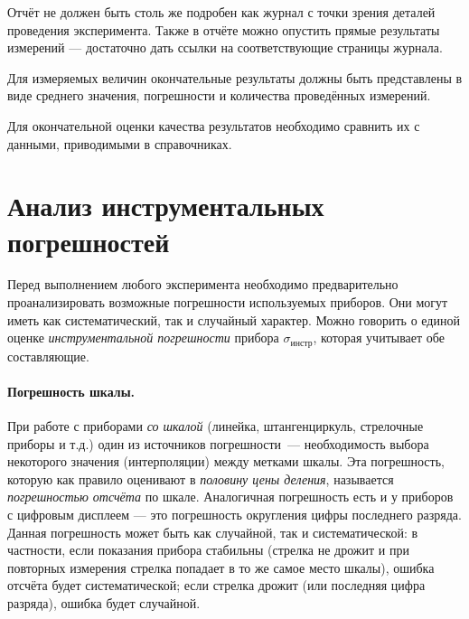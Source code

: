 Отчёт не должен быть столь же подробен как журнал с точки зрения деталей проведения эксперимента. Также в отчёте можно опустить прямые результаты измерений --- достаточно дать ссылки на соответствующие страницы журнала.

Для измеряемых величин окончательные результаты должны быть представлены
в виде среднего значения, погрешности и количества проведённых измерений.

Для окончательной оценки качества результатов необходимо
сравнить их с данными, приводимыми в справочниках.



\section{Анализ инструментальных погрешностей}

Перед выполнением любого эксперимента необходимо предварительно проанализировать
возможные погрешности используемых приборов. Они могут
иметь как систематический, так и случайный характер. Можно говорить
о единой оценке \emph{инструментальной погрешности} прибора
$\sigma_{\text{инстр}}$, которая учитывает обе составляющие.

\paragraph{Погрешность шкалы.}
При работе с приборами \emph{со шкалой} (линейка, штангенциркуль, стрелочные
приборы и т.д.) один из источников погрешности~--- необходимость
выбора некоторого значения (интерполяции) между метками шкалы. Эта
погрешность, которую как правило оценивают в \emph{половину цены деления},
называется \emph{погрешностью отсчёта} по шкале. Аналогичная погрешность
есть и у приборов с цифровым дисплеем --- это погрешность
округления цифры последнего разряда. Данная погрешность может быть
как случайной, так и систематической: в частности, если показания
прибора стабильны (стрелка не дрожит и при повторных измерения стрелка
попадает в то же самое место шкалы), ошибка отсчёта будет систематической;
если стрелка дрожит (или  последняя цифра разряда),
ошибка будет случайной.

